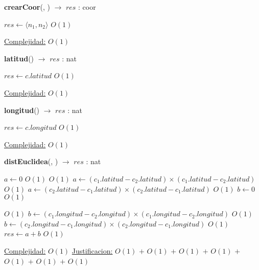 \begin{Algoritmos}
   
\begin{algorithm}[H]{\textbf{crearCoor}(, ) $\to$ $res$ : coor}
    	\begin{algorithmic}[1]
			 \State $res \gets  \langle n_1 , n_2 \rangle $ \Comment $O(1)$

			\medskip
			\Statex \underline{Complejidad:} $O(1)$
    	\end{algorithmic}
\end{algorithm}
   
\begin{algorithm}[H]{\textbf{latitud}() $\to$ $res$ : nat}
    	\begin{algorithmic}[1]
			 \State $res \gets  c.latitud $ \Comment $O(1)$

			\medskip
			\Statex \underline{Complejidad:} $O(1)$
			
    	\end{algorithmic}
\end{algorithm}


\begin{algorithm}[H]{\textbf{longitud}() $\to$ $res$ : nat}
    	\begin{algorithmic}[1]
			 \State $res \gets  c.longitud $ \Comment $O(1)$

			\medskip
			\Statex \underline{Complejidad:} $O(1)$
    	\end{algorithmic}
\end{algorithm}

\begin{algorithm}[H]{\textbf{distEuclidea}(, ) $\to$ $res$ : nat}
    	\begin{algorithmic}[1]
    		 \State $a \gets 0$ \Comment $O(1)$
    		 	\Comment $O(1)$
				\State $a \gets (c_1.latitud - c_2.latitud) \times (c_1.latitud - c_2.latitud)$ \Comment $O(1)$	
			\Else 
				\State $a \gets (c_2.latitud - c_1.latitud) \times (c_2.latitud - c_1.latitud)$ \Comment $O(1)$	
			\EndIf
			\State $b \gets 0$ \Comment $O(1)$

				\Comment $O(1)$
				\State $b \gets (c_1.longitud - c_2.longitud) \times (c_1.longitud - c_2.longitud)$ \Comment $O(1)$	
			\Else 
				\State $b \gets (c_2.longitud - c_1.longitud) \times (c_2.longitud - c_1.longitud)$ \Comment $O(1)$	
			\EndIf
			\State $res \gets  a + b$ \Comment $O(1)$

			\medskip
			\Statex \underline{Complejidad:} $O(1)$
			\Statex \underline{Justificacion:} $O(1)$ $+$ $O(1)$ $+$ $O(1)$ $+$ $O(1)$ $+$ $O(1)$ $+$ $O(1)$ $+$ $O(1)$
    	\end{algorithmic}
\end{algorithm}

\end{Algoritmos}